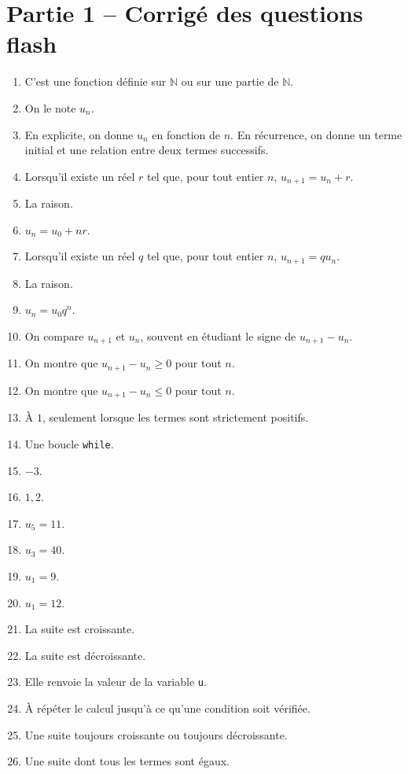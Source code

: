 \documentclass[11pt,a4paper]{article}
\newcommand{\code}[1]{\texttt{#1}}
\newcounter{question}
\newcounter{reponse}
\newenvironment{blocreponses}[1]{%
  \begin{tcolorbox}[enhanced,breakable,colback=bleuclair,colframe=bleufonce,boxrule=0.6pt,arc=2mm,left=2mm,right=2mm,top=2mm,bottom=1.5mm,title={\bfseries #1},coltitle=white,colbacktitle=bleufonce,before skip=3mm,after skip=3mm, fontupper=\large]
  \large
  \begin{enumerate}[leftmargin=*,label=\textbf{\arabic*.},itemsep=0.42em,topsep=0.5em]
  \setcounter{enumi}{\value{reponse}}
}{%
  \setcounter{reponse}{\value{enumi}}
  \end{enumerate}
  \end{tcolorbox}
}
\begin{document}
\section*{Partie 1 -- Corrigé des questions flash}
\begin{blocreponses}{Réponses -- Questions flash}
  \item C'est une fonction définie sur $\mathbb N$ ou sur une partie de $\mathbb N$.
  \item On le note $u_n$.
  \item En explicite, on donne $u_n$ en fonction de $n$. En récurrence, on donne un terme initial et une relation entre deux termes successifs.
  \item Lorsqu'il existe un réel $r$ tel que, pour tout entier $n$, $u_{n+1}=u_n+r$.
  \item La raison.
  \item $u_n=u_0+nr$.
  \item Lorsqu'il existe un réel $q$ tel que, pour tout entier $n$, $u_{n+1}=q u_n$.
  \item La raison.
  \item $u_n=u_0q^n$.
  \item On compare $u_{n+1}$ et $u_n$, souvent en étudiant le signe de $u_{n+1}-u_n$.
  \item On montre que $u_{n+1}-u_n\geq0$ pour tout $n$.
  \item On montre que $u_{n+1}-u_n\leq0$ pour tout $n$.
  \item À $1$, seulement lorsque les termes sont strictement positifs.
  \item Une boucle \code{while}.
  \item $-3$.
  \item $1{,}2$.
  \item $u_5=11$.
  \item $u_3=40$.
  \item $u_1=9$.
  \item $u_1=12$.
  \item La suite est croissante.
  \item La suite est décroissante.
  \item Elle renvoie la valeur de la variable \code{u}.
  \item À répéter le calcul jusqu'à ce qu'une condition soit vérifiée.
  \item Une suite toujours croissante ou toujours décroissante.
  \item Une suite dont tous les termes sont égaux.

\end{blocreponses}
\end{document}
